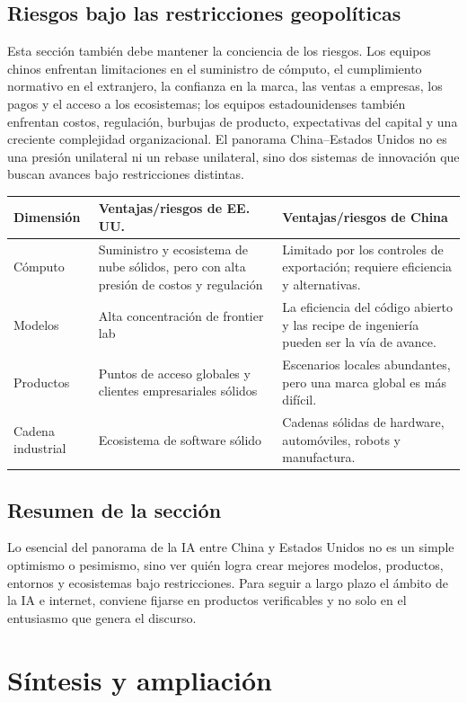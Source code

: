 \documentclass[a4paper]{article}
\begin{document}
\subsection{Riesgos bajo las restricciones geopolíticas}

Esta sección también debe mantener la conciencia de los riesgos. Los equipos chinos enfrentan limitaciones en el suministro de cómputo, el cumplimiento normativo en el extranjero, la confianza en la marca, las ventas a empresas, los pagos y el acceso a los ecosistemas; los equipos estadounidenses también enfrentan costos, regulación, burbujas de producto, expectativas del capital y una creciente complejidad organizacional. El panorama China–Estados Unidos no es una presión unilateral ni un rebase unilateral, sino dos sistemas de innovación que buscan avances bajo restricciones distintas.

\noindent\begin{tabularx}{\textwidth}{p{}p{}X}
\toprule
Dimensión & Ventajas/riesgos de EE.\,UU. & Ventajas/riesgos de China \\
\midrule
Cómputo & Suministro y ecosistema de nube sólidos, pero con alta presión de costos y regulación & Limitado por los controles de exportación; requiere eficiencia y alternativas. \\
Modelos & Alta concentración de frontier lab & La eficiencia del código abierto y las recipe de ingeniería pueden ser la vía de avance. \\
Productos & Puntos de acceso globales y clientes empresariales sólidos & Escenarios locales abundantes, pero una marca global es más difícil. \\
Cadena industrial & Ecosistema de software sólido & Cadenas sólidas de hardware, automóviles, robots y manufactura. \\
\bottomrule
\end{tabularx}

\subsection{Resumen de la sección}

Lo esencial del panorama de la IA entre China y Estados Unidos no es un simple optimismo o pesimismo, sino ver quién logra crear mejores modelos, productos, entornos y ecosistemas bajo restricciones. Para seguir a largo plazo el ámbito de la IA e internet, conviene fijarse en productos verificables y no solo en el entusiasmo que genera el discurso.
\section{Síntesis y ampliación}
\end{document}

